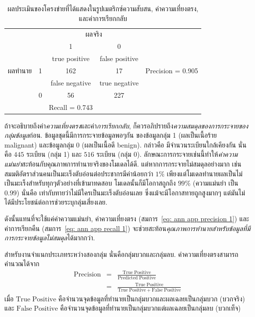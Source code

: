 \begin{table}[hbtp]
\caption{ผลประเมินของโครงข่ายที่ได้แสดงในรูปเมตริกซ์ความสับสน, ค่าความเที่ยงตรง, และค่าการเรียกกลับ}
\label{tbl: ann app precision recall}
\begin{center}
\begin{tabular}{ccccc}

        &       & \multicolumn{2}{c}{ผลจริง} & \\
        &       & 1              &   0      & \\
\cline{3-4}        
         &       & \multicolumn{1}{|c}{true positive} & \multicolumn{1}{|c|}{false positive} &  \\
ผลทำนาย   &     1 & \multicolumn{1}{|c}{162} & \multicolumn{1}{|c|}{17} & Precision = 0.905 \\
\cline{3-4}
         &      & \multicolumn{1}{|c}{false negative} & \multicolumn{1}{|c|}{true negative} & \\
         &     0 & \multicolumn{1}{|c}{56} & \multicolumn{1}{|c|}{227} & \\         
\cline{3-4}
         &       & Recall = 0.743 &               &
\end{tabular} 
\end{center}
\end{table}

ถ้าจะอธิบายถึงค่า\textit{ความเที่ยงตรง}และค่า\textit{การเรียกกลับ}, 
ก็ควรอภิปรายถึง\textit{ความสมดุลของการกระจายของกลุ่มข้อมูล}ก่อน.
ข้อมูลชุดนี้มีการกระจายข้อมูลพอๆกัน ของข้อมูลกลุ่ม 1 (ผลเป็นเนื้อร้าย malignant) และข้อมูลกลุ่ม 0 (ผลเป็นเนื้อดี benign).
กล่าวคือ มีจำนวนระเบียนใกล้เคียงกัน นั่นคือ $445$ ระเบียน (กลุ่ม 1) และ $516$ ระเบียน (กลุ่ม 0).
ลักษณะการกระจายเช่นนี้ทำให้\textit{ค่าความแม่นยำ}สะท้อนกับคุณภาพการทำนายจริงของโมเดลได้ดี.
%
แต่หากการกระจายไม่สมดุลอย่างมาก เช่น สมมติอัตราส่วนคนเป็นมะเร็งตับอ่อนต่อประชากรมีค่าน้อยกว่า $1\%$ เพียงแต่โมเดลทำนายผลเป็นไม่เป็นมะเร็งสำหรับทุกๆตัวอย่างที่เข้ามาทดสอบ 
โมเดลนั้นก็มีโอกาสถูกถึง $99\%$ (ความแม่นยำ เป็น $0.99$)
นั่นคือ เท่ากับทายว่าไม่มีใครเป็นมะเร็งตับอ่อนเลย ซึ่งแม้จะมีโอกาสทายถูกสูงมากๆ 
แต่มันไม่ได้มีประโยชน์ต่อการช่วยระบุกลุ่มเสี่ยงเลย.

ดังนั้นแทนที่จะใช้แค่ค่าความแม่นยำ, ค่าความเที่ยงตรง (สมการ~\ref{eq: ann app precision 1}) และค่าการเรียกคืน (สมการ~\ref{eq: ann app recall 1}) 
จะช่วยสะท้อน\textit{คุณภาพการทำนายสำหรับข้อมูลที่มีการกระจายข้อมูลไม่สมดุล}ได้มากกว่า.

สำหรับงานจำแนกประเภทระหว่างสองกลุ่ม นั่นคือกลุ่มบวกและกลุ่มลบ.
ค่าความเที่ยงตรงสามารถคำนวณได้จาก
\begin{eqnarray}
   \mathrm{Precision} &=& \frac{\mathrm{True\; Positive}}{\mathrm{Predicted\; Positive}}
\label{eq: ann app precision 1} \\
   &=& \frac{\mathrm{True\; Positive}}{\mathrm{True\; Positive} + \mathrm{False\; Positive}}
\label{eq: ann app precision 2}
\end{eqnarray}
เมื่อ $\mathrm{True\; Positive}$ คือจำนวนจุดข้อมูลที่ทำนายเป็นกลุ่มบวกและผลเฉลยเป็นกลุ่มบวก (บวกจริง)
และ $\mathrm{False\; Positive}$ คือจำนวนจุดข้อมูลที่ทำนายเป็นกลุ่มบวกแต่ผลเฉลยเป็นกลุ่มลบ
(บวกเท็จ)

